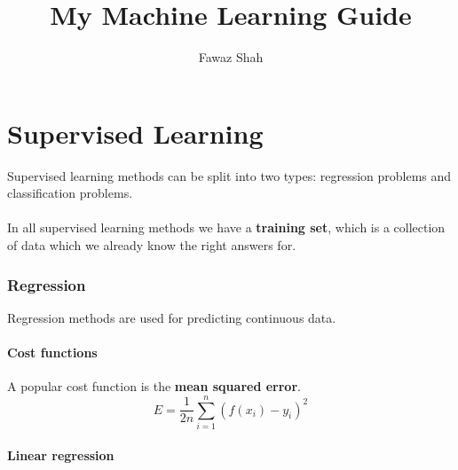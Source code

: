 \documentclass{scrartcl}
\title{My Machine Learning Guide}
\subtitle{}
\date{}
\author{Fawaz Shah}
\begin{document}
\large
\maketitle
\tableofcontents
\newpage

\part{Supervised Learning}

Supervised learning methods can be split into two types: regression problems and classification problems.
\\\\
In all supervised learning methods we have a \textbf{training set}, which is a collection of data which we already know the right answers for.

\section{Regression}

Regression methods are used for predicting continuous data.

\subsection{Cost functions}

A popular cost function is the \textbf{mean squared error}.
\begin{equation}
E = \frac{1}{2n} \sum^{n}_{i = 1} (f(x_{i}) - y_{i})^{2}
\end{equation}

\subsection{Linear regression}
\end{document}
